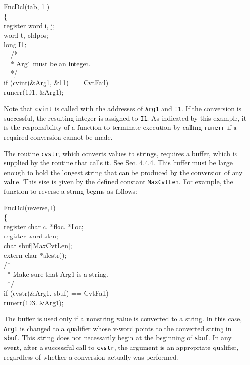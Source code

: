 \goodbreak
\begin{iconcode}
\color{red}FncDcl(tab, 1 )\\
\{\\
\>register word i, j;\\
\>word t, oldpos;\\
\>long I1;\\
\>\ \ /*\\
\>\ \ * Arg1 must be an integer.\\
\>\ \ */\\
\>if (cvint(\&Arg1, \&11) == CvtFail)\\
\>runerr(101, \&Arg1);
\end{iconcode}

\noindent
Note that \texttt{cvint} is called with the addresses of \texttt{Arg1} and
\texttt{I1}. If the conversion is successful, the resulting integer is assigned
to \texttt{I1}. As indicated by this example, it is the responsibility of a
function to terminate execution by calling \texttt{runerr} if a required
conversion cannot be made.

The routine \texttt{cvstr}, which converts values to strings, requires a buffer,
which is supplied by the routine that calls it.  See Sec. 4.4.4. This buffer
must be large enough to hold the longest string that can be produced by the
conversion of any value. This size is given by the defined constant
\texttt{MaxCvtLen}. For example, the function to reverse a string begins as
follows:

\goodbreak
\begin{iconcode}
\color{red}FncDcl(reverse,1)\\
\{\\
\>register char c. *floc. *lloc;\\
\>register word slen;\\
\>char sbuf[MaxCvtLen];\\
\>extern char *alcstr();\\
\>/*\\
\>\ * Make sure that Arg1 is a string.\\
\>\ */\\
\>if (cvstr(\&Arg1. sbuf) == CvtFail)\\
\>\>runerr(103. \&Arg1);
\end{iconcode}

\noindent
The buffer is used only if a nonstring value is converted to a string. In this
case, \texttt{Arg1} is changed to a qualifier whose v-word points to the
converted string in \texttt{sbuf}. This string does not necessarily begin at the
beginning of \texttt{sbuf}. In any event, after a successful call to
\texttt{cvstr}, the argument is an appropriate qualifier, regardless of whether
a conversion actually was performed.

